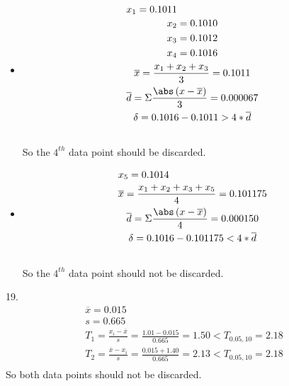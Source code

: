 \documentclass{article}
\begin{document}
\begin{itemize}
    \item 
    \begin{equation}
        \begin{multlined}
            x_1 = 0.1011\\
            x_2 = 0.1010\\
            x_3 = 0.1012\\
            x_4 = 0.1016\\
            \overline{x} = \frac{x_1+x_2+x_3}{3} = 0.1011\\
            \overline{d} = \Sigma\frac{\abs\left(x - \overline{x}\right)}{3} = 0.000067\\
            \delta = 0.1016 - 0.1011 > 4 *\overline{d}\\
        \end{multlined}
    \end{equation}
    So the $4^{th}$ data point should be discarded.\\
    \item
    \begin{equation}
        \begin{multlined}
            x_5 = 0.1014\\
            \overline{x} = \frac{x_1+x_2+x_3+x_5}{4} = 0.101175\\
            \overline{d} = \Sigma\frac{\abs\left(x - \overline{x}\right)}{4} = 0.000150\\
            \delta = 0.1016 - 0.101175 < 4*\overline{d}\\
        \end{multlined}
    \end{equation}
    So the $4^{th}$ data point should not be discarded.\\
\end{itemize}
19.\begin{equation}
    \begin{multlined}
        \overline{x} = 0.015\\
        s = 0.665\\
        T_1 = \frac{x_i - \overline{x}}{s} = \frac{1.01 - 0.015}{0.665} = 1.50 < T_{0.05, 10} = 2.18\\
        T_2 = \frac{\overline{x} - x_i}{s} = \frac{0.015 + 1.40}{0.665} = 2.13 < T_{0.05, 10} = 2.18\\
    \end{multlined}
\end{equation}
So both data points should not be discarded.\\
\end{document}
